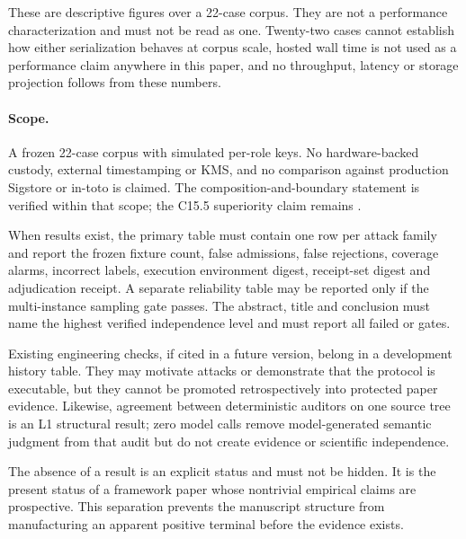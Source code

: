 These are descriptive figures over a 22-case corpus. They are not a performance
characterization and must not be read as one. Twenty-two cases cannot establish
how either serialization behaves at corpus scale, hosted wall time is not used
as a performance claim anywhere in this paper, and no throughput, latency or
storage projection follows from these numbers.

\paragraph{Scope.} A frozen 22-case corpus with simulated per-role keys. No
hardware-backed custody, external timestamping or KMS, and no comparison against
production Sigstore or in-toto is claimed. The composition-and-boundary statement
is verified within that scope; the C15.5 superiority claim remains \cannotcheck{}.

When results exist, the primary table must contain one row per attack family and
report the frozen fixture count, false admissions, false rejections, coverage
alarms, incorrect labels, execution environment digest, receipt-set digest and
adjudication receipt. A separate reliability table may be reported only if the
multi-instance sampling gate passes. The abstract, title and conclusion must name
the highest verified independence level and must report all failed or
\cannotcheck{} gates.

Existing engineering checks, if cited in a future version, belong in a development
history table. They may motivate attacks or demonstrate that the protocol is
executable, but they cannot be promoted retrospectively into protected paper
evidence. Likewise, agreement between deterministic auditors on one source tree is
an L1 structural result; zero model calls remove model-generated semantic judgment
from that audit but do not create evidence or scientific independence.

The absence of a result is an explicit status and must not be hidden. It is the
present status of a framework paper whose nontrivial empirical claims are prospective.
This separation prevents the manuscript structure from manufacturing an apparent
positive terminal before the evidence exists.

